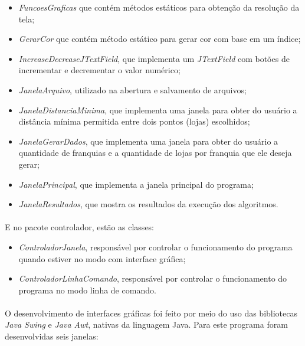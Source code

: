 \documentclass[12pt]{article}
\begin{document}
\begin{itemize}
    \item \textit{FuncoesGraficas} que contém métodos estáticos para obtenção da resolução da tela;
    \item \textit{GerarCor} que contém método estático para gerar cor com base em um índice;
    \item \textit{IncreaseDecreaseJTextField}, que implementa um \textit{JTextField} com botões de incrementar e decrementar o valor numérico;
    \item \textit{JanelaArquivo}, utilizado na abertura e salvamento de arquivos;
    \item \textit{JanelaDistanciaMinima}, que implementa uma janela para obter do usuário a distância mínima permitida entre dois pontos (lojas) escolhidos;
    \item \textit{JanelaGerarDados}, que implementa uma janela para obter do usuário a quantidade de franquias e a quantidade de lojas por franquia que ele deseja gerar;
    \item \textit{JanelaPrincipal}, que implementa a janela principal do programa;
    \item \textit{JanelaResultados}, que mostra os resultados da execução dos algoritmos. 
\end{itemize}

\paragraph{}E no pacote controlador, estão as classes:

\begin{itemize}
    \item \textit{ControladorJanela}, responsável por controlar o funcionamento do programa quando estiver no modo com interface gráfica;
    \item \textit{ControladorLinhaComando}, responsável por controlar o funcionamento do programa no modo linha de comando.
\end{itemize}

\paragraph{}O desenvolvimento de interfaces gráficas foi feito por meio do uso das bibliotecas \textit{Java Swing} e \textit{Java Awt}, nativas da linguagem Java. Para este programa foram desenvolvidas seis janelas:
\end{document}
